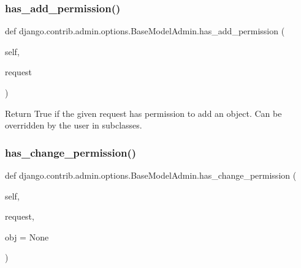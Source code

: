 \subsubsection{\texorpdfstring{has\+\_\+add\+\_\+permission()}{has\_add\_permission()}}
{\footnotesize\ttfamily def django.\+contrib.\+admin.\+options.\+Base\+Model\+Admin.\+has\+\_\+add\+\_\+permission (\begin{DoxyParamCaption}\item[{}]{self,  }\item[{}]{request }\end{DoxyParamCaption})}

\begin{DoxyVerb}Return True if the given request has permission to add an object.
Can be overridden by the user in subclasses.
\end{DoxyVerb}
 \mbox{\label{classdjango_1_1contrib_1_1admin_1_1options_1_1_base_model_admin_a4277a867d799a4ba8c1b113bd891b48b}} 
\subsubsection{\texorpdfstring{has\+\_\+change\+\_\+permission()}{has\_change\_permission()}}
{\footnotesize\ttfamily def django.\+contrib.\+admin.\+options.\+Base\+Model\+Admin.\+has\+\_\+change\+\_\+permission (\begin{DoxyParamCaption}\item[{}]{self,  }\item[{}]{request,  }\item[{}]{obj = {\ttfamily None} }\end{DoxyParamCaption})}

